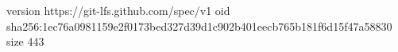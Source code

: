 version https://git-lfs.github.com/spec/v1
oid sha256:1ec76a0981159e2f0173bed327d39d1c902b401eecb765b181f6d15f47a58830
size 443
